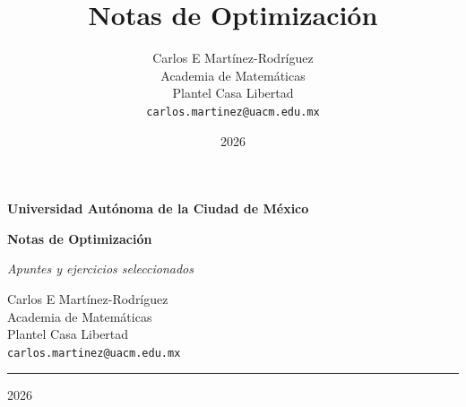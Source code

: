 \documentclass[12pt,twoside]{article}
\title{Notas de Optimizaci\'on}
\author{Carlos E Mart\'inez-Rodr\'iguez\\
  \small Academia de Matem\'aticas\\
  \small Plantel Casa Libertad\\
  \texttt{carlos.martinez@uacm.edu.mx}
}
\date{2026}
\begin{document}
\begin{titlepage}
  \thispagestyle{empty} %
  \begin{center}
    \vspace*{2.5cm}

    {\Large \textbf{Universidad Aut\'onoma de la Ciudad de M\'exico}\par}
    \vspace{2.5cm}

    {\huge \textbf{Notas de Optimizaci\'on}\par}
    \vspace{0.8cm}
    {\Large \textit{Apuntes y ejercicios seleccionados}\par}

    \vspace{3.5cm}
    {\large
      Carlos E Mart\'inez-Rodr\'iguez\\
      Academia de Matem\'aticas\\
      Plantel Casa Libertad\\
      \texttt{carlos.martinez@uacm.edu.mx}
    \par}

    \vspace{4cm}
    \rule{0.6\textwidth}{0.6pt}\par
    \vspace{0.5cm}
    {\large 2026}\par
  \end{center}
\end{titlepage}
\thispagestyle{empty}
\tableofcontents
\clearpage
\thispagestyle{empty}
\null
\newpage
\setcounter{page}{1}
\newpage






\newpage


\newpage


\newpage


\newpage


%

%
\newpage
\nocite{*}

\end{document}
